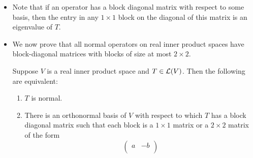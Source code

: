 \documentclass[../main.tex]{subfiles}
\begin{document}
\begin{itemize}
\begin{theorem}
\begin{enumerate}[label={\textup{(}\alph*\textup{)}}]
            \item $(T|_U)^*=(T^*)|_U$.
            \begin{proof}
                For every $u,v\in U$, we have that
                \begin{equation*}
                    \inp{u}{(T|_U)^*v} = \inp{(T|_U)u}{v} = \inp{Tu}{v} = \inp{u}{T^*v} = \inp{u}{((T^*)|_U)v}
                \end{equation*}
                Therefore, $(T|_U)^*=(T^*)|_U$, as desired.
            \end{proof}
            \item $T|_U\in\ope{U}$ and $T|_{U^\perp}\in\ope{U^\perp}$ are normal operators.
            \begin{proof}
                We have from the above results that
                \begin{equation*}
                    (T|_U)(T|_U)^* = T|_U(T^*)|_U
                    = (TT^*)|_U
                    = (T^*T)|_U
                    = (T^*)|_UT|_U
                    = (T|_U)^*(T|_U)
                \end{equation*}
                and similarly for $U^\perp$.
            \end{proof}
        \end{enumerate}
    \end{theorem}
    \item Note that if an operator has a block diagonal matrix with respect to some basis, then the entry in any $1\times 1$ block on the diagonal of this matrix is an eigenvalue of $T$.
    \item We now prove that all normal operators on real inner product spaces have block-diagonal matrices with blocks of size at most $2\times 2$.
    \begin{theorem}\label{trm:normalReal}
        Suppose $V$ is a real inner product space and $T\in\mathcal{L}(V)$. Then the following are equivalent:
        \begin{enumerate}[label={\textup{(}\alph*\textup{)}}]
            \item $T$ is normal.
            \item There is an orthonormal basis of $V$ with respect to which $T$ has a block diagonal matrix such that each block is a $1\times 1$ matrix or a $2\times 2$ matrix of the form
            \begin{equation*}
                \begin{pmatrix}
                    a & -b\\

\end{pmatrix}
\end{equation*}
\end{enumerate}
\end{theorem}
\end{itemize}
\end{document}
